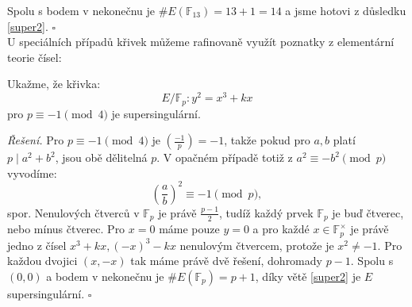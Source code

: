 \documentclass[12pt]{report}
\begin{document}
Spolu s bodem v nekonečnu je $\# E(\mathbb{F}_{13})=13+1=14$ a jsme hotovi z důsledku \ref{super2}. \hfill $\square$\\

U speciálních případů křivek můžeme rafinovaně využít poznatky z elementární teorie čísel:

\begin{priklad}
Ukažme, že křivka:
 $$E/\mathbb{F}_p : y^2 = x^3 + kx$$
pro $ p \equiv -1 \pmod{4}$ je supersingulární.
\end{priklad}
\noindent \textit{Řešení.} Pro $p \equiv -1 \pmod{4}$ je $\genfrac{(}{)}{}{}{-1}{p} = -1$, takže pokud pro $a,b$ platí $p \mid a^2 + b^2$, jsou obě dělitelná $p$. V opačném případě totiž z $a^2 \equiv -b^2 \pmod{p}$ vyvodíme:
\begin{equation*}
\left(\frac{a}{b}\right)^2 \equiv -1 \pmod{p},
\end{equation*} 
spor. Nenulových čtverců v $\mathbb{F}_p$ je právě $\frac{p-1}{2}$, tudíž každý prvek $\mathbb{F}_p$ je buď čtverec, nebo mínus čtverec. Pro $x= 0$ máme pouze $y = 0$ a pro každé $x \in \mathbb{F}_p^{\times}$ je právě jedno z čísel $x^3+kx, (-x)^3-kx$ nenulovým čtvercem, protože je $x^2 \neq -1$. Pro každou dvojici $(x,-x)$ tak máme právě dvě řešení, dohromady $p-1$. Spolu s $(0,0)$ a bodem v nekonečnu je $\# E(\mathbb{F}_p) = p+1$, díky větě \ref{super2} je $E$ supersingulární. \hfill $\square$\\
\end{document}
